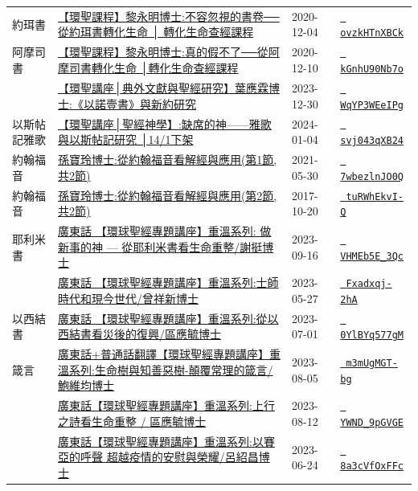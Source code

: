 \documentclass{book}
\begin{document}
{\begin{xltabular}{\textwidth}{|p{0.15\textwidth} p{0.6\textwidth}|p{0.07\textwidth} p{0.1\textwidth}|}
約珥書   & \hyperref[sec:ovzkHTnXBCk]{【環聖課程】黎永明博士:不容忽視的書卷──從約珥書轉化生命 │ 轉化生命查經課程} & 2020-12-04 & \href{https://youtube.com/watch?v=ovzkHTnXBCk}{\texttt{ ovzkHTnXBCk}} \\
阿摩司書   & \hyperref[sec:kGnhU90Nb7o]{【環聖課程】黎永明博士:真的假不了──從阿摩司書轉化生命 │轉化生命查經課程} & 2020-12-10 & \href{https://youtube.com/watch?v=kGnhU90Nb7o}{\texttt{ kGnhU90Nb7o}} \\
    & \hyperref[sec:WqYP3WEeIPg]{【環聖講座│典外文獻與聖經研究】葉應霖博士:《以諾壹書》與新約研究} & 2023-12-30 & \href{https://youtube.com/watch?v=WqYP3WEeIPg}{\texttt{ WqYP3WEeIPg}} \\
以斯帖記雅歌   & \hyperref[sec:svj043qXB24]{【環聖講座│聖經神學】:缺席的神——雅歌與以斯帖記研究 │14/1下架} & 2024-01-04 & \href{https://youtube.com/watch?v=svj043qXB24}{\texttt{ svj043qXB24}} \\
約翰福音   & \hyperref[sec:7wbezlnJO0Q]{孫寶玲博士:從約翰福音看解經與應用(第1節,共2節)} & 2021-05-30 & \href{https://youtube.com/watch?v=7wbezlnJO0Q}{\texttt{ 7wbezlnJO0Q}} \\
約翰福音   & \hyperref[sec:tuRWhEkvI_Q]{孫寶玲博士:從約翰福音看解經與應用(第2節,共2節)} & 2017-10-20 & \href{https://youtube.com/watch?v=tuRWhEkvI-Q}{\texttt{ tuRWhEkvI-Q}} \\
耶利米書   & \hyperref[sec:VHMEb5E_3Qc]{廣東話 【環球聖經專題講座】重溫系列: 做新事的神 — 從耶利米書看生命重整/謝挺博士} & 2023-09-16 & \href{https://youtube.com/watch?v=VHMEb5E_3Qc}{\texttt{ VHMEb5E\_3Qc}} \\
    & \hyperref[sec:Fxadxqj_2hA]{廣東話 【環球聖經專題講座】重溫系列:士師時代和現今世代/曾祥新博士} & 2023-05-27 & \href{https://youtube.com/watch?v=Fxadxqj-2hA}{\texttt{ Fxadxqj-2hA}} \\
以西結書   & \hyperref[sec:0YlBYq577gM]{廣東話 【環球聖經專題講座】重溫系列:從以西結書看災後的復興/區應毓博士} & 2023-07-01 & \href{https://youtube.com/watch?v=0YlBYq577gM}{\texttt{ 0YlBYq577gM}} \\
箴言   & \hyperref[sec:m3mUgMGT_bg]{廣東話+普通話翻譯【環球聖經專題講座】重溫系列:生命樹與知善惡樹-顛覆常理的箴言/鮑維均博士} & 2023-08-05 & \href{https://youtube.com/watch?v=m3mUgMGT-bg}{\texttt{ m3mUgMGT-bg}} \\
    & \hyperref[sec:YWND_9pGVGE]{廣東話【環球聖經專題講座】重溫系列:上行之詩看生命重整 / 區應毓博士} & 2023-08-12 & \href{https://youtube.com/watch?v=YWND_9pGVGE}{\texttt{ YWND\_9pGVGE}} \\
    & \hyperref[sec:8a3cVfOxFFc]{廣東話【環球聖經專題講座】重溫系列:以賽亞的呼聲 超越疫情的安慰與榮耀/呂紹昌博士} & 2023-06-24 & \href{https://youtube.com/watch?v=8a3cVfOxFFc}{\texttt{ 8a3cVfOxFFc}} \\

\end{xltabular}}
\end{document}
